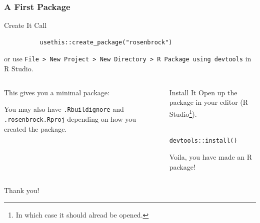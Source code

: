 \documentclass[aspectratio=1610,onlytextwidth]{beamer}
\begin{document}
\begin{frame}[c,fragile]
  \frametitle{A First Package}
  \begin{block}{Create It}
    Call
    \begin{lstlisting}
          usethis::create_package("rosenbrock")
        \end{lstlisting}
    or use \texttt{File > New Project > New Directory > R Package using devtools} in R Studio.
  \end{block}

  \pause\bigskip

  \begin{columns}[T]
    \begin{column}{0.45\textwidth}
      This gives you a \alert{minimal} package:

      \medskip


      \medskip\pause

      You may also have \texttt{.Rbuildignore} and \texttt{.rosenbrock.Rproj}
      depending on how you created the package.
    \end{column}

    \pause

    \begin{column}{0.45\textwidth}
      \begin{block}{Install It}
        Open up the package in your editor (R Studio\footnote{In which case it
          should alread be opened.}).
        \begin{lstlisting}
          devtools::install()
        \end{lstlisting}

        \bigskip

        Voila, you have made an R package!
      \end{block}
    \end{column}
  \end{columns}

\end{frame}

\begin{frame}[standout]
  Thank you!
\end{frame}
\end{document}
